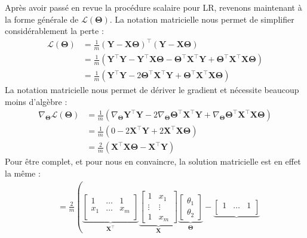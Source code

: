 {Après avoir passé en revue la procédure scalaire pour LR, revenons maintenant à la forme générale de $\mathcal L(\bm\Theta)$. La notation matricielle nous permet de simplifier considérablement la perte :
%
\begin{align}
\mathcal L(\bm\Theta) & = \frac{1}{m} (\mathbf Y - \mathbf X \bm\Theta)^\intercal(\mathbf Y - \mathbf X \bm\Theta) \\ &= \frac{1}{m} (\mathbf Y^\intercal \mathbf Y - \mathbf Y^\intercal \mathbf X \bm\Theta - \bm\Theta^\intercal \mathbf X^\intercal \mathbf Y + \bm\Theta^\intercal \mathbf X^\intercal \mathbf X \bm\Theta) \\ &= \frac{1}{m} (\mathbf Y^\intercal \mathbf Y - 2 \bm\Theta^\intercal \mathbf X^\intercal \mathbf Y + \bm\Theta^\intercal \mathbf X^\intercal \mathbf X \bm\Theta)
\end{align}
%
La notation matricielle nous permet de dériver le gradient et nécessite beaucoup moins d'algèbre :
%
\begin{align}
\nabla_{\bm\Theta}\mathcal L(\bm\Theta) & = \frac{1}{m} (\nabla_{\bm\Theta}\mathbf Y^\intercal \mathbf Y - 2 \nabla_{\bm\Theta} \bm\Theta^\intercal \mathbf X^\intercal \mathbf Y + \nabla_{\bm\Theta}\bm\Theta^\intercal \mathbf X^\intercal \mathbf X \bm\Theta) \\ & = \frac{1}{m} ( 0 - 2\mathbf{X}^\intercal \mathbf Y + 2 \mathbf{X}^\intercal \mathbf X \bm\Theta ) \\ & = \boxed{\frac{2}{m} (\mathbf{X}^\intercal \mathbf X \bm\Theta - \mathbf{X}^\intercal \mathbf Y)}
\end{align}
%
Pour être complet, et pour nous en convaincre, la solution matricielle est en effet la même :
%
\begin{align}
& = \frac{2}{m}\left(
\underbrace{\begin{bmatrix}
1 & \ldots & 1 \\
x_1 & \ldots & x_m \\
\end{bmatrix}}_{\mathbf{X}^\intercal}
\underbrace{\begin{bmatrix}
1 & x_1 \\
\vdots & \vdots \\
1 & x_m
\end{bmatrix}}_{\mathbf{X}}
\underbrace{\begin{bmatrix}
\theta_1 \\
\theta_2
\end{bmatrix}}_{\bm\Theta} -
\underbrace{\begin{bmatrix}
1 & \ldots & 1 \\

\end{bmatrix}}
\end{align}}
